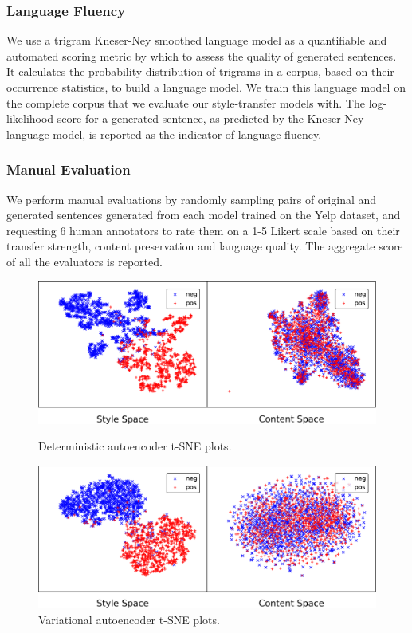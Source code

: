 \documentclass[letterpaper]{article} %
\begin{document}
\subsubsection{Language Fluency}
We use a trigram Kneser-Ney smoothed language model \cite{kneser1995improved} as a quantifiable and automated scoring metric by which to assess the quality of generated sentences.
It calculates the probability distribution of trigrams in a corpus, based on their occurrence statistics, to build a language model.
We train this language model on the complete corpus that we evaluate our style-transfer models with.
The log-likelihood score for a generated sentence, as predicted by the Kneser-Ney language model, is reported as the indicator of language fluency.

\subsubsection{Manual Evaluation}
We perform manual evaluations by randomly sampling pairs of original and generated sentences generated from each model trained on the Yelp dataset, and requesting 6 human annotators to rate them on a 1-5 Likert scale \cite{stent2005evaluating} based on their transfer strength, content preservation and language quality.
The aggregate score of all the evaluators is reported.

\begin{figure}[ht]
	\captionsetup{justification=centering}

	\includegraphics[width=\linewidth]{dae-latent-spaces}
	\caption{Deterministic autoencoder t-SNE plots.}
	\label{fig:dae-tsne}

	\includegraphics[width=\linewidth]{vae-latent-spaces}
	\caption{Variational autoencoder t-SNE plots.}
	\label{fig:vae-tsne}
\end{figure}
\end{document}
